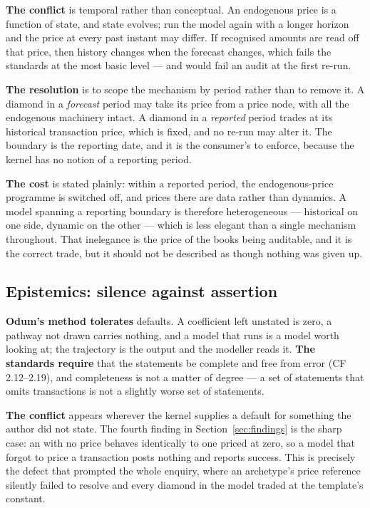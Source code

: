 \documentclass[11pt,a4paper]{article}
\begin{document}
\textbf{The conflict} is temporal rather than conceptual. An endogenous price is a function of state, and state evolves; run the model again with a longer horizon and the price at every past instant may differ. If recognised amounts are read off that price, then history changes when the forecast changes, which fails the standards at the most basic level --- and would fail an audit at the first re-run.

\textbf{The resolution} is to scope the mechanism by period rather than to remove it. A diamond in a \emph{forecast} period may take its price from a price node, with all the endogenous machinery intact. A diamond in a \emph{reported} period trades at its historical transaction price, which is fixed, and no re-run may alter it. The boundary is the reporting date, and it is the consumer's to enforce, because the kernel has no notion of a reporting period.

\textbf{The cost} is stated plainly: within a reported period, the endogenous-price programme is switched off, and prices there are data rather than dynamics. A model spanning a reporting boundary is therefore heterogeneous --- historical on one side, dynamic on the other --- which is less elegant than a single mechanism throughout. That inelegance is the price of the books being auditable, and it is the correct trade, but it should not be described as though nothing was given up.

\subsection{Epistemics: silence against assertion}
\label{sec:silence}

\textbf{Odum's method tolerates} defaults. A coefficient left unstated is zero, a pathway not drawn carries nothing, and a model that runs is a model worth looking at; the trajectory is the output and the modeller reads it. \textbf{The standards require} that the statements be complete and free from error (CF 2.12--2.19), and completeness is not a matter of degree --- a set of statements that omits transactions is not a slightly worse set of statements.

\textbf{The conflict} appears wherever the kernel supplies a default for something the author did not state. The fourth finding in Section~\ref{sec:findings} is the sharp case: an  with no price behaves identically to one priced at zero, so a model that forgot to price a transaction posts nothing and reports success. This is precisely the defect that prompted the whole enquiry, where an archetype's price reference silently failed to resolve and every diamond in the model traded at the template's constant.
\end{document}
